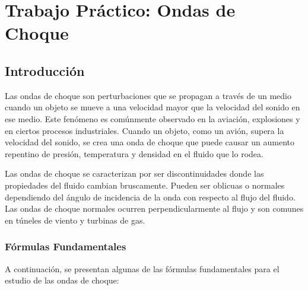 \documentclass[../main]{subfiles}
\begin{document}
\chapter{Trabajo Práctico: Ondas de Choque}

\section{Introducción}

Las ondas de choque son perturbaciones que se propagan a través de un medio cuando un objeto se mueve a una velocidad mayor que la velocidad del sonido en ese medio. Este fenómeno es comúnmente observado en la aviación, explosiones y en ciertos procesos industriales. Cuando un objeto, como un avión, supera la velocidad del sonido, se crea una onda de choque que puede causar un aumento repentino de presión, temperatura y densidad en el fluido que lo rodea.

Las ondas de choque se caracterizan por ser discontinuidades donde las propiedades del fluido cambian bruscamente. Pueden ser oblicuas o normales dependiendo del ángulo de incidencia de la onda con respecto al flujo del fluido. Las ondas de choque normales ocurren perpendicularmente al flujo y son comunes en túneles de viento y turbinas de gas.

\subsection{Fórmulas Fundamentales}

A continuación, se presentan algunas de las fórmulas fundamentales para el estudio de las ondas de choque:


\end{document}
